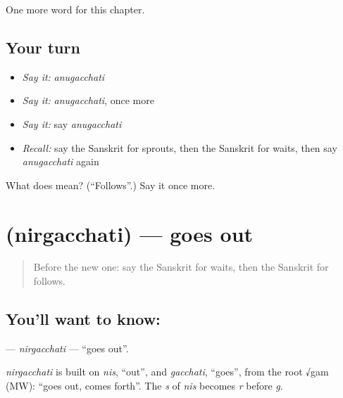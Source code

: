 \begin{grammarlens}[title={What you've built}]
One more word for this chapter.
\end{grammarlens}

\subsection*{Your turn}
\begin{itemize}
\raggedright
  \item \emph{Say it:} \emph{anugacchati}
  \item \emph{Say it:} \emph{anugacchati}, once more
  \item \emph{Say it:} say \emph{anugacchati}
  \item \emph{Recall:} say the Sanskrit for sprouts, then the Sanskrit for waits, then say \emph{anugacchati} again
\end{itemize}

\begin{tcolorbox}[breakable,colback=teal!4,colframe=teal!35!black,title={Before you move on}]
What does  mean? (\textquotedblleft{}Follows\textquotedblright{}.) Say it once more.
\end{tcolorbox}
\section[\texorpdfstring{\sk{निर्गच्छति} (nirgacchati)}{निर्गच्छति (nirgacchati)}]{ (nirgacchati) — goes out}

\label{lesson:SA-C233-nirgacchati}



\begin{quote}
Before the new one: say the Sanskrit for waits, then the Sanskrit for follows.
\end{quote}

\subsection*{You'll want to know: }
\textbf{} — \emph{nirgacchati} — \textquotedblleft{}goes out\textquotedblright{}.

\begin{cousinweb}
\emph{nirgacchati} is built on \emph{nis}, \textquotedblleft{}out\textquotedblright{}, and \emph{gacchati}, \textquotedblleft{}goes\textquotedblright{}, from the root √gam (MW): \textquotedblleft{}goes out, comes forth\textquotedblright{}. The \emph{s} of \emph{nis} becomes \emph{r} before \emph{g}.
\end{cousinweb}

